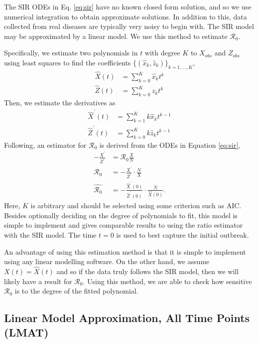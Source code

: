 \documentclass[12pt]{article}
\newcommand{\rr}{\ensuremath{\mathcal{R}_0}}
\begin{document}
The SIR ODEs in Eq. \ref{eq:sir} have no known closed form solution, and so we use numerical integration to obtain approximate solutions.  In addition to this, data collected from real diseases are typically very noisy to begin with.  The SIR model may be approximated by a linear model.  We use this method to estimate $\rr$.

Specifically, we estimate two polynomials in \(t\) with degree $K$  to \(X_{obs}\)
and \(Z_{obs}\) using least squares to find the coefficients $\{(\hat{x}_k,
\hat{z}_k)\}_{k=1, \dots, K}$,
\begin{align*}
\hat{X}(t) &= \sum_{k=0}^K \hat{x}_k t^k\\
{\hat{Z}}(t) &= \sum_{k=0}^K \hat{z}_k t^k
\end{align*}
Then, we estimate the derivatives as
\begin{align*}
\hat{X}^\prime(t) &= \sum_{k=1}^K k \hat{x}_k t^{k-1}\\
\hat{Z}^\prime(t) &= \sum_{k=0}^K k \hat{z}_k t^{k-1}
\end{align*}
Following,  an estimator for \(\rr\) is derived from the ODEs in Equation \eqref{eq:sir},
\begin{align}
  - \frac{X^\prime}{Z^\prime}&= \rr \frac{X}{N} \nonumber\\
  \rr &=       -\frac{X^\prime}{
        Z^\prime} \cdot \frac{N}{X} \nonumber\\
  \hat{\rr} &= -\frac{\hat{X}^\prime(0)}{ \hat{Z}^\prime(0)} \cdot \frac{N}{\hat{X}(0)}. \nonumber
  \end{align}
  Here, $K$ is arbitrary and should be selected using some criterion such as AIC.  Besides optionally deciding on the degree of polynomials to fit, this model is simple to implement and gives comparable results to using the ratio estimator with the SIR model.  The time $t=0$ is used to best capture the initial outbreak.

  An advantage of using this estimation method is that it is simple to implement using any linear modelling software.  On the other hand, we assume $X(t) = \hat{X}(t)$ and so if the data truly follows the SIR model, then we will likely have a result for $\rr$.  Using this method, we are able to check how sensitive $\rr$ is to the degree of the fitted polynomial.

\subsection{Linear Model Approximation, All Time Points (LMAT)}\label{linear-model-approximation-all-time-points-degree-10}
\end{document}
